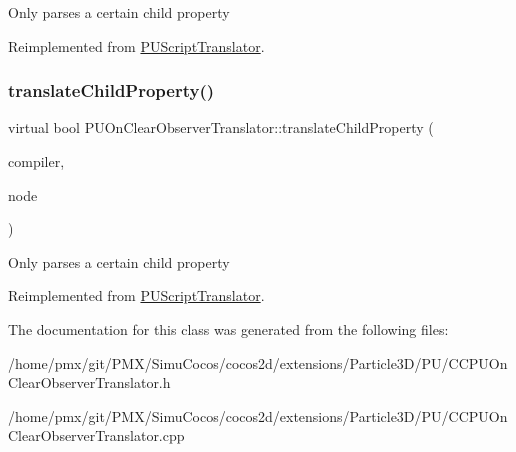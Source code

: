 Only parses a certain child property 

Reimplemented from \hyperlink{classPUScriptTranslator_a0374d83a8a04e57918975d525e0f8fe8}{P\+U\+Script\+Translator}.

\mbox{\label{classPUOnClearObserverTranslator_ad37d1a237797fdb41d43321ea507e1fe}} 
\subsubsection{\texorpdfstring{translate\+Child\+Property()}{translateChildProperty()}\hspace{0.1cm}{\footnotesize\ttfamily [2/2]}}
{\footnotesize\ttfamily virtual bool P\+U\+On\+Clear\+Observer\+Translator\+::translate\+Child\+Property (\begin{DoxyParamCaption}\item[{\hyperlink{classPUScriptCompiler}{P\+U\+Script\+Compiler} $\ast$}]{compiler,  }\item[{\hyperlink{classPUAbstractNode}{P\+U\+Abstract\+Node} $\ast$}]{node }\end{DoxyParamCaption})\hspace{0.3cm}{\ttfamily [virtual]}}

Only parses a certain child property 

Reimplemented from \hyperlink{classPUScriptTranslator_a0374d83a8a04e57918975d525e0f8fe8}{P\+U\+Script\+Translator}.



The documentation for this class was generated from the following files\+:\begin{DoxyCompactItemize}
\item 
/home/pmx/git/\+P\+M\+X/\+Simu\+Cocos/cocos2d/extensions/\+Particle3\+D/\+P\+U/C\+C\+P\+U\+On\+Clear\+Observer\+Translator.\+h\item 
/home/pmx/git/\+P\+M\+X/\+Simu\+Cocos/cocos2d/extensions/\+Particle3\+D/\+P\+U/C\+C\+P\+U\+On\+Clear\+Observer\+Translator.\+cpp\end{DoxyCompactItemize}
